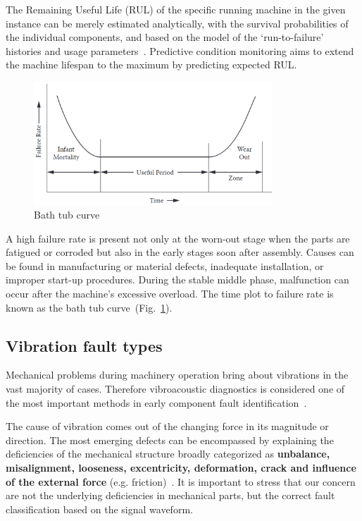 The Remaining Useful Life (RUL) of the specific running machine in the given instance can be merely estimated analytically, with the survival probabilities of the individual components, and based on the model of the `run-to-failure' histories and usage parameters~\cite{okoh_overview_2014}. Predictive condition monitoring aims to extend the machine lifespan to the maximum by predicting expected RUL.

\begin{figure}[h]
	\centering
	\includegraphics[width=0.8\textwidth]{assets/bath-tub-curve.png}
	\caption{Bath tub curve~\cite{mohanty_machinery_2015}}
	\label{fig:bath-tub-curve}
\end{figure}

A high failure rate is present not only at the worn-out stage when the parts are fatigued or corroded but also in the early stages soon after assembly. Causes can be found in manufacturing or material defects, inadequate installation, or improper start-up procedures. During the stable middle phase, malfunction can occur after the machine's excessive overload. The time plot to failure rate is known as the bath tub curve~(Fig.~\ref{fig:bath-tub-curve}).

\subsection{Vibration fault types}
Mechanical problems during machinery operation bring about vibrations in the vast majority of cases. Therefore vibroacoustic diagnostics is considered one of the most important methods in early component fault identification~\cite{ziaran_technicka_2013}.

The cause of vibration comes out of the changing force in its magnitude or direction. The most emerging defects can be encompassed by explaining the deficiencies of the mechanical structure broadly categorized as \textbf{unbalance, misalignment, looseness, excentricity, deformation, crack and influence of the external force} (e.g. friction)~\cite{davies_handbook_2012}. It is important to stress that our concern are not the underlying deficiencies in mechanical parts, but the correct fault classification based on the signal waveform.

